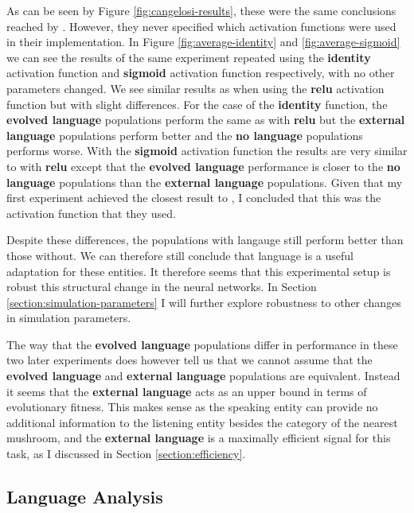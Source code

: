 \documentclass[12pt,a4paper,twoside,openright]{report}
\begin{document}
As can be seen by Figure \ref{fig:cangelosi-results}, these were the same conclusions reached by \citet{Cangelosi1998}. However, they never specified which activation functions were used in their implementation. In Figure \ref{fig:average-identity} and \ref{fig:average-sigmoid} we can see the results of the same experiment repeated using the {\bf identity} activation function and {\bf sigmoid} activation function respectively, with no other parameters changed. We see similar results as when using the {\bf relu} activation function but with slight differences. For the case of the {\bf identity} function, the {\bf evolved language} populations perform the same as with {\bf relu} but the {\bf external language} populations perform better and the {\bf no language} populations performs worse. With the {\bf sigmoid} activation function the results are very similar to with {\bf relu} except that the {\bf evolved language} performance is closer to the {\bf no language} populations than the {\bf external language} populations. Given that my first experiment achieved the closest result to \citet{Cangelosi1998}, I concluded that this was the activation function that they used.

Despite these differences, the populations with langauge still perform better than those without. We can therefore still conclude that language is a useful adaptation for these entities. It therefore seems that this experimental setup is robust this structural change in the neural networks. In Section \ref{section:simulation-parameters} I will further explore robustness to other changes in simulation parameters. 

The way that the {\bf evolved language} populations differ in performance in these two later experiments does however tell us that we cannot assume that the {\bf evolved language} and {\bf external language} populations are equivalent. Instead it seems that the {\bf external language} acts as an upper bound in terms of evolutionary fitness. This makes sense as the speaking entity can provide no additional information to the listening entity besides the category of the nearest mushroom, and the {\bf external language} is a maximally efficient signal for this task, as I discussed in Section \ref{section:efficiency}. 


\subsection{Language Analysis}\label{section:languageanalysis}
\end{document}
